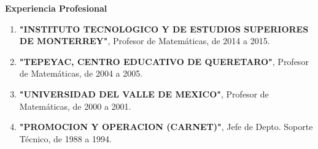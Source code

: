 {\large \textbf{Experiencia Profesional}}

\hrulefill

\begin{enumerate}

\item \textbf{"INSTITUTO TECNOLOGICO Y DE ESTUDIOS SUPERIORES DE MONTERREY"}, Profesor de Matemáticas, de 2014 a 2015.

\item \textbf{"TEPEYAC, CENTRO EDUCATIVO DE QUERETARO"}, Profesor de Matemáticas, de 2004 a 2005.

\item \textbf{"UNIVERSIDAD DEL VALLE DE MEXICO"}, Profesor de Matemáticas, de 2000 a 2001.

\item \textbf{"PROMOCION Y OPERACION (CARNET)"}, Jefe de Depto. Soporte Técnico, de 1988 a 1994.

\end{enumerate}
